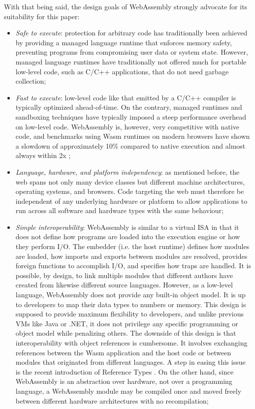With that being said, the design goals of WebAssembly strongly advocate for its suitability for this paper:

\begin{itemize}
    \item \emph{Safe to execute}: protection for arbitrary code has traditionally been achieved by providing a managed language runtime that enforces memory safety, preventing programs from compromising user data or system state. However, managed language runtimes have traditionally not offered much for portable low-level code, such as C/C++ applications, that do not need garbage collection;
    \item \emph{Fast to execute}: low-level code like that emitted by a C/C++ compiler is typically optimized ahead-of-time. On the contrary, managed runtimes and sandboxing techniques have typically imposed a steep performance overhead on low-level code. WebAssembly is, however, very competitive with native code, and benchmarks using Wasm runtimes on modern browsers have shown a slowdown of approximately 10\% compared to native execution and almost always within 2x \cite{haas2017bringing};
    \item \emph{Language, hardware, and platform independency}: as mentioned before, the web spans not only many device classes but different machine architectures, operating systems, and browsers. Code targeting the web must therefore be independent of any underlying hardware or platform to allow applications to run across all software and hardware types with the same behaviour;
    \item \emph{Simple interoperability}: WebAssembly is similar to a virtual ISA in that it does not define how programs are loaded into the execution engine or how they perform I/O. The embedder (i.e. the host runtime) defines how modules are loaded, how imports and exports between modules are resolved, provides foreign functions to accomplish I/O, and specifies how traps are handled. It is possible, by design, to link multiple modules that different authors have created from likewise different source languages. However, as a low-level language, WebAssembly does not provide any built-in object model. It is up to developers to map their data types to numbers or memory. This design is supposed to provide maximum flexibility to developers, and unlike previous VMs like Java or .NET, it does not privilege any specific programming or object model while penalizing others. The downside of this design is that interoperability with object references is cumbersome. It involves exchanging references between the Wasm application and the host code or between modules that originated from different languages. A step in easing this issue is the recent introduction of Reference Types \cite{reference-types}. On the other hand, since WebAssembly is an abstraction over hardware, not over a programming language, a WebAssembly module may be compiled once and moved freely between different hardware architectures with no recompilation;

\end{itemize}
